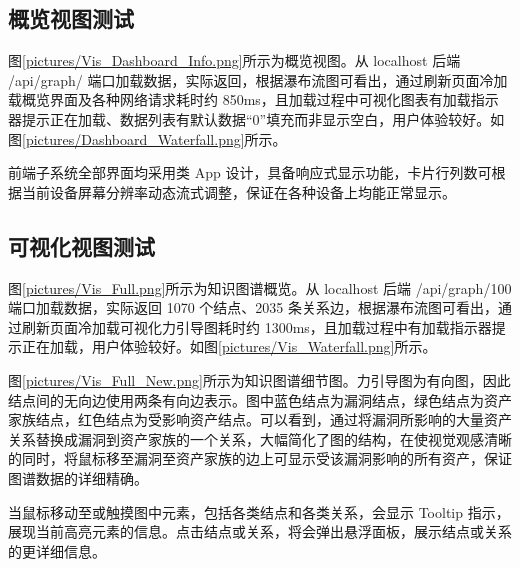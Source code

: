 \documentclass[a4paper,AutoFakeBold,oneside,12pt]{book}
\begin{document}
\subsection{概览视图测试\label{概览视图测试}}

图\ref{pictures/Vis_Dashboard_Info.png}所示为概览视图。从 localhost 后端 /api/graph/ 端口加载数据，实际返回，根据瀑布流图可看出，通过刷新页面冷加载概览界面及各种网络请求耗时约 850ms，且加载过程中可视化图表有加载指示器提示正在加载、数据列表有默认数据“0”填充而非显示空白，用户体验较好。如图\ref{pictures/Dashboard_Waterfall.png}所示。

前端子系统全部界面均采用类 App 设计，具备响应式显示功能，卡片行列数可根据当前设备屏幕分辨率动态流式调整，保证在各种设备上均能正常显示。



\subsection{可视化视图测试\label{可视化视图测试}}

图\ref{pictures/Vis_Full.png}所示为知识图谱概览。从 localhost 后端 /api/graph/100 端口加载数据，实际返回 1070 个结点、2035 条关系边，根据瀑布流图可看出，通过刷新页面冷加载可视化力引导图耗时约 1300ms，且加载过程中有加载指示器提示正在加载，用户体验较好。如图\ref{pictures/Vis_Waterfall.png}所示。



图\ref{pictures/Vis_Full_New.png}所示为知识图谱细节图。力引导图为有向图，因此结点间的无向边使用两条有向边表示。图中蓝色结点为漏洞结点，绿色结点为资产家族结点，红色结点为受影响资产结点。可以看到，通过将漏洞所影响的大量资产关系替换成漏洞到资产家族的一个关系，大幅简化了图的结构，在使视觉观感清晰的同时，将鼠标移至漏洞至资产家族的边上可显示受该漏洞影响的所有资产，保证图谱数据的详细精确。

当鼠标移动至或触摸图中元素，包括各类结点和各类关系，会显示 Tooltip 指示，展现当前高亮元素的信息。点击结点或关系，将会弹出悬浮面板，展示结点或关系的更详细信息。
\end{document}
